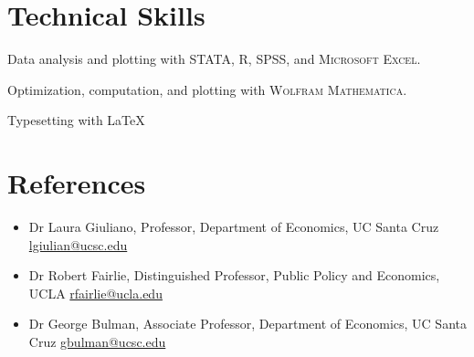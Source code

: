 \documentclass[letter,10pt]{article}
\newcommand{\dateright}[1]{\hfill{\small #1}}
\begin{document}
\section{Technical Skills}
\item Data analysis and plotting with \textsc{STATA, R, SPSS}, and \textsc{Microsoft Excel}. 
\item Optimization, computation, and plotting with \textsc{Wolfram Mathematica}.
\item Typesetting with \LaTeX

\section{References}
\begin{itemize}
    \item Dr Laura Giuliano, Professor, Department of Economics, UC Santa Cruz \dateright{\href{mailto:lgiulian@ucsc.edu}{lgiulian@ucsc.edu}}
    \item Dr Robert Fairlie, Distinguished Professor, Public Policy and Economics, UCLA \dateright{\href{mailto:rfairlie@ucla.edu}{rfairlie@ucla.edu}}
    \item Dr George Bulman, Associate Professor, Department of Economics, UC Santa Cruz \dateright{\href{mailto:gbulman@ucsc.edu}{gbulman@ucsc.edu}}
\end{itemize}
\end{document}
